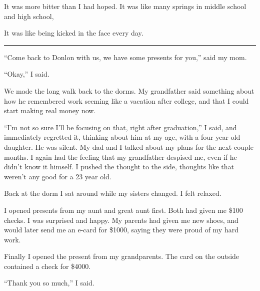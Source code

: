 It was more bitter than I had hoped.  It was like many springs in middle school
and high school, 

It was like being kicked in the face every day.

\plainfancybreak{12pt}{2}{* * *}

``Come back to Donlon with us, we have some presents for you,'' said my mom. 

``Okay,'' I said.  

We made the long walk back to the dorms.  My grandfather said something about
how he remembered work seeming like a vacation after college, and that I could
start making real money now.

``I'm not so sure I'll be focusing on that, right after graduation,'' I said,
and immediately regretted it, thinking about him at my age, with a four year old
daughter.  He was silent.  My dad and I talked about my plans for the next
couple months.  I again had the feeling that my grandfather despised me, even if
he didn't know it himself.  I pushed the thought to the side, thoughts like that
weren't any good for a 23 year old.

Back at the dorm I sat around while my sisters changed.  I felt relaxed.

I opened presents from my aunt and great aunt first.  Both had given me \$100
checks.  I was surprised and happy.  My parents had given me new shoes, and
would later send me an e-card for \$1000, saying they were proud of my hard
work.  

Finally I opened the present from my grandparents.  The card on the outside
contained a check for \$4000.  

``Thank you so much,'' I said.
